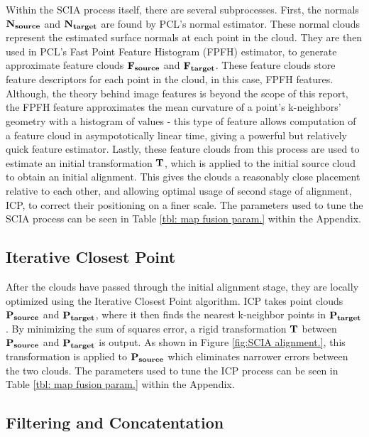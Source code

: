 \documentclass[letterpaper, oneside, 10pt]{report}
\begin{document}
    \noindent Within the SCIA process itself, there are several subprocesses. First, the normals $\bf{N_{source}}$ and $\bf{N_{target}}$ are found by PCL's normal estimator. These normal clouds represent the estimated surface normals at each point in the cloud. They are then used in PCL's Fast Point Feature Histogram (FPFH) \cite{rusu2009fast,rusu2009fastlabel} estimator, to generate approximate feature clouds $\bf{F_{source}}$ and $\bf{F_{target}}$. These feature clouds store feature descriptors for each point in the cloud, in this case, FPFH features. Although, the theory behind image features is beyond the scope of this report, the FPFH feature approximates the mean curvature of a point's k-neighbors' geometry with a histogram of values - this type of feature allows computation of a feature cloud in asympototically linear time, giving a powerful but relatively quick feature estimator. Lastly, these feature clouds from this process are used to estimate an initial transformation $\bf{T}$, which is applied to the initial source cloud to obtain an initial alignment. This gives the clouds a reasonably close placement relative to each other, and allowing optimal usage of second stage of alignment, ICP, to correct their positioning on a finer scale. The parameters used to tune the SCIA process can be seen in Table \ref{tbl: map fusion param.} within the Appendix.

    \subsection{Iterative Closest Point}

    \noindent After the clouds have passed through the initial alignment stage, they are locally optimized using the Iterative Closest Point algorithm. ICP takes point clouds $\bf{P_{source}}$ and $\bf{P_{target}}$, where it then finds the nearest k-neighbor points in $\bf{P_{target}}$. By minimizing the sum of squares error, a rigid transformation $\bf{T}$ between $\bf{P_{source}}$ and $\bf{P_{target}}$ is output. As shown in Figure \ref{fig:SCIA alignment.}, this transformation is applied to $\bf{P_{source}}$ which eliminates narrower errors between the two clouds. The parameters used to tune the ICP process can be seen in Table \ref{tbl: map fusion param.} within the Appendix.

    \subsection{Filtering and Concatentation}
\end{document}
